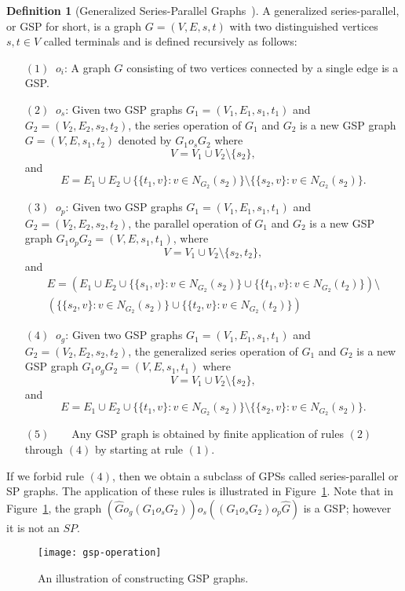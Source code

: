 \documentclass[12pt]{article}
\theoremstyle{definition}
\newtheorem{definition}[theorem]{Definition}
\theoremstyle{remark}
\begin{document}
\begin{definition}[Generalized Series-Parallel Graphs~\cite{chebolu2012exact}]
	A generalized series-parallel, or GSP for short, is a graph $G=(V,E,s,t)$ with two distinguished vertices  $s,t\in V$ called terminals and is defined recursively as follows:
	\begin{itemize}
		\item[$(1)\;\;o_i$:]
		A graph $G$ consisting of two vertices connected by a single edge is a GSP.
		\item[$(2)\;\;o_s$:]
		Given two GSP graphs $G_1=(V_1,E_1,s_1,t_1)$ and $G_2=(V_2,E_2,s_2,t_2)$, the series operation of $G_1$ and $G_2$  is a new GSP graph $G=(V,E, s_1,t_2)$ denoted by $G_1 o_s G_2$ where
		$$V=V_1\cup V_2\setminus \{s_2\},$$
		and
		$$E=E_1 \cup E_2 \cup\{\{t_1,v\}: v\in N_{G_2}(s_2)\}\setminus \{\{s_2,v\}: v\in N_{G_2}(s_2)\}.$$
			\item[$(3)\;\;o_p$:]
		Given two GSP graphs $G_1=(V_1,E_1,s_1,t_1)$ and $G_2=(V_2,E_2,s_2,t_2)$, the parallel operation of $G_1$ and $G_2$  is  a new GSP graph  $G_1 o_p G_2=(V,E, s_1,t_1)$, where
				$$V=V_1\cup V_2\setminus \{s_2,t_2\},$$ and
		\begin{align*}
		E=\left(E_1 \cup E_2 \cup\{\{s_1,v\}: v\in N_{G_2}(s_2)\}\cup\{\{t_1,v\}: v\in N_{G_2}(t_2)\}\right)\setminus\\
		\left(\{\{s_2, v\}: v\in N_{G_2}(s_2)\} \cup \{\{t_2,v\}: v\in N_{G_2}(t_2)\}\right)
		\end{align*}
		
		\item[$(4)\;\;o_g$:]	Given two GSP graphs $G_1=(V_1,E_1,s_1,t_1)$ and $G_2=(V_2,E_2,s_2,t_2)$, the generalized series operation of $G_1$ and $G_2$  is a new GSP graph $G_1 o_g G_2=(V,E, s_1,t_1)$ where
			$$V=V_1\cup V_2\setminus \{s_2\}, $$ and
		$$E=E_1 \cup E_2 \cup\{\{t_1,v\}: v\in N_{G_2}(s_2)\}\setminus \{\{s_2,v\}: v\in N_{G_2}(s_2)\}.$$
		\item[$(5)\;\;\;\;\;\;$]		Any GSP graph is obtained by finite application of rules $(2)$  through $(4)$ by starting at rule $(1)$.
	\end{itemize}

\end{definition}
If we forbid rule $(4)$, then we obtain a subclass of GPSs called series-parallel or SP graphs. The application of these rules is illustrated in Figure~\ref{fig-gspop}. Note that in Figure~\ref{fig-gspop}, the graph $(\hat{G}o_g(G_1o_sG_2))o_s((G_1o_sG_2)o_p\hat{G})$ is a GSP; however it is not an $SP$.
\begin{figure}[!h]
	\centering
	\texttt{[image: gsp-operation]}
	\caption{An illustration of constructing GSP graphs.}\label{fig-gspop}
\end{figure}
\end{document}
